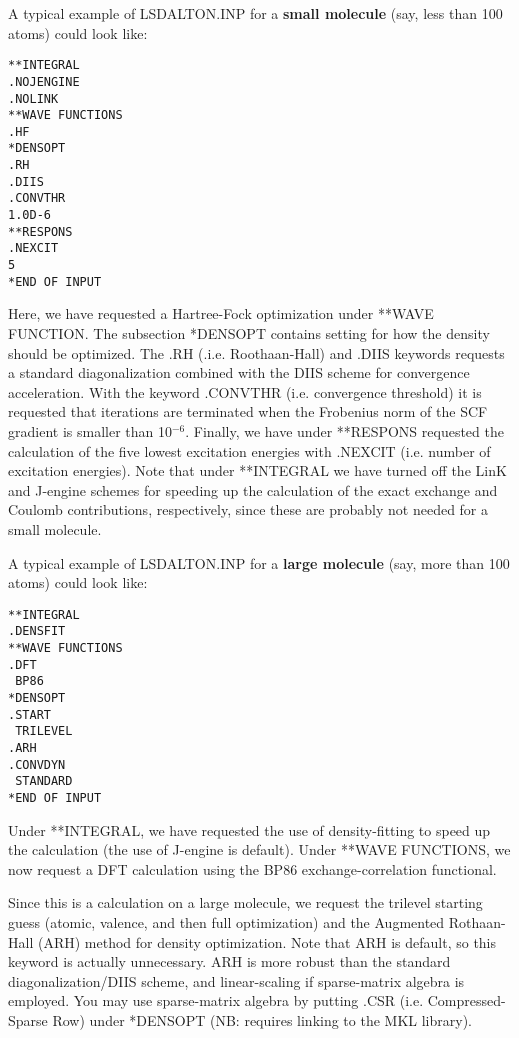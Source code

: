 A typical example of LSDALTON.INP for a {\bf small molecule} (say, less than 100 atoms) could look like:
\begin{verbatim}
**INTEGRAL
.NOJENGINE
.NOLINK
**WAVE FUNCTIONS
.HF
*DENSOPT
.RH
.DIIS
.CONVTHR
1.0D-6
**RESPONS
.NEXCIT
5
*END OF INPUT
\end{verbatim}
Here, we have requested a Hartree-Fock optimization under **WAVE FUNCTION. The subsection
*DENSOPT contains setting for how the density should be optimized. The .RH (.i.e. Roothaan-Hall)
and .DIIS keywords requests a standard diagonalization combined with the DIIS scheme for convergence
acceleration. With the keyword .CONVTHR (i.e. convergence threshold) 
it is requested that iterations are terminated when the 
Frobenius norm of the SCF gradient is smaller than 10$^{-6}$. Finally, we have under **RESPONS requested
the calculation of the five lowest excitation energies with .NEXCIT (i.e. number of excitation energies).
Note that under **INTEGRAL we have turned off the LinK and J-engine schemes for speeding up the calculation
of the exact exchange and Coulomb contributions, respectively, since these are probably not needed for a small
molecule.

A typical example of LSDALTON.INP for a {\bf large molecule} (say, more than 100 atoms) could look like: 
\begin{verbatim}
**INTEGRAL
.DENSFIT
**WAVE FUNCTIONS
.DFT
 BP86
*DENSOPT
.START
 TRILEVEL
.ARH
.CONVDYN
 STANDARD
*END OF INPUT
\end{verbatim}
Under **INTEGRAL, we have requested the use of density-fitting to speed up the calculation (the use of J-engine is default). 
Under **WAVE FUNCTIONS, we now request a DFT
calculation using the BP86 exchange-correlation functional.

Since this is a calculation on a large molecule, 
we request the trilevel starting guess (atomic, valence, and then full
optimization) and the Augmented Rothaan-Hall (ARH) method for density optimization. 
Note that ARH is default, so this keyword is actually unnecessary.
ARH is more robust than the standard diagonalization/DIIS scheme, and linear-scaling if sparse-matrix algebra is employed. You may use
sparse-matrix algebra by putting .CSR (i.e. Compressed-Sparse Row) under *DENSOPT (NB: requires linking to the MKL library). 

